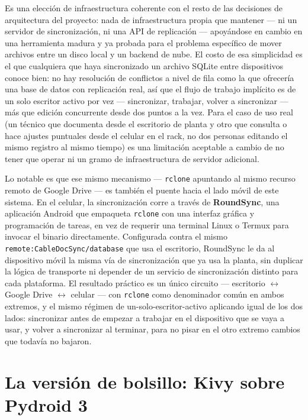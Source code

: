 \documentclass[11pt,twocolumn]{article}
\begin{document}
Es una elección de infraestructura coherente con el resto de las decisiones de arquitectura del proyecto: nada de infraestructura propia que mantener --- ni un servidor de sincronización, ni una API de replicación --- apoyándose en cambio en una herramienta madura y ya probada para el problema específico de mover archivos entre un disco local y un backend de nube. El costo de esa simplicidad es el que cualquiera que haya sincronizado un archivo SQLite entre dispositivos conoce bien: no hay resolución de conflictos a nivel de fila como la que ofrecería una base de datos con replicación real, así que el flujo de trabajo implícito es de un solo escritor activo por vez --- sincronizar, trabajar, volver a sincronizar --- más que edición concurrente desde dos puntos a la vez. Para el caso de uso real (un técnico que documenta desde el escritorio de planta y otro que consulta o hace ajustes puntuales desde el celular en el rack, no dos personas editando el mismo registro al mismo tiempo) es una limitación aceptable a cambio de no tener que operar ni un gramo de infraestructura de servidor adicional.

Lo notable es que ese mismo mecanismo --- \texttt{rclone} apuntando al mismo recurso remoto de Google Drive --- es también el puente hacia el lado móvil de este sistema. En el celular, la sincronización corre a través de \textbf{RoundSync}, una aplicación Android que empaqueta \texttt{rclone} con una interfaz gráfica y programación de tareas, en vez de requerir una terminal Linux o Termux para invocar el binario directamente. Configurada contra el mismo \texttt{remote:CableDocSync/database} que usa el escritorio, RoundSync le da al dispositivo móvil la misma vía de sincronización que ya usa la planta, sin duplicar la lógica de transporte ni depender de un servicio de sincronización distinto para cada plataforma. El resultado práctico es un único circuito --- escritorio $\leftrightarrow$ Google Drive $\leftrightarrow$ celular --- con \texttt{rclone} como denominador común en ambos extremos, y el mismo régimen de un-solo-escritor-activo aplicando igual de los dos lados: sincronizar antes de empezar a trabajar en el dispositivo que se vaya a usar, y volver a sincronizar al terminar, para no pisar en el otro extremo cambios que todavía no bajaron.

\section{La versión de bolsillo: Kivy sobre Pydroid 3}
\end{document}
